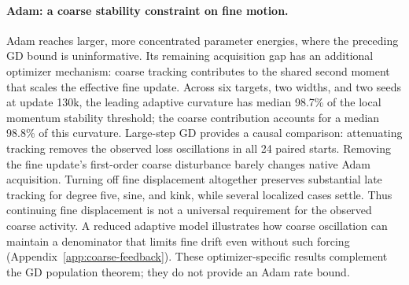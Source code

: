 \paragraph{Adam: a coarse stability constraint on fine motion.}
Adam reaches larger, more concentrated parameter energies, where the preceding
GD bound is uninformative. Its remaining acquisition gap has an additional
optimizer mechanism: coarse tracking contributes to the shared second moment
that scales the effective fine update. Across six targets, two widths, and two
seeds at update 130k, the leading adaptive curvature has median 98.7\% of the
local momentum stability threshold; the coarse contribution accounts for a
median 98.8\% of this curvature. Large-step GD provides a causal comparison:
attenuating tracking removes the observed loss oscillations in all 24 paired
starts. Removing the fine update's first-order coarse disturbance barely
changes native Adam acquisition. Turning off fine displacement altogether
preserves substantial late tracking for degree five, sine, and kink, while
several localized cases settle. Thus continuing fine displacement is not a
universal requirement for the observed coarse activity. A reduced adaptive
model illustrates how coarse oscillation can maintain a denominator that
limits fine drift even without such forcing
(Appendix~\ref{app:coarse-feedback}). These optimizer-specific results complement
the GD population theorem; they do not provide an Adam rate bound.
